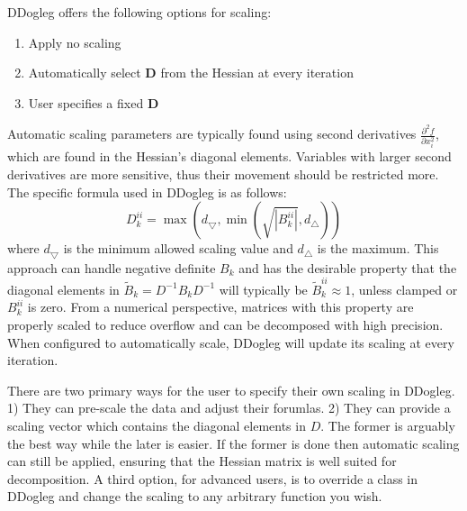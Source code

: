 \documentclass[peerreview,compsoc,onecolumn]{IEEEtran}
\newenvironment{enumargin}[1]{\begin{enumerate}[leftmargin=#1\textwidth , rightmargin=#1\textwidth]}{\end{enumerate}}
\begin{document}
DDogleg offers the following options for scaling:
\begin{enumargin}{0.2}
\item Apply no scaling
\item Automatically select $\bm{D}$ from the Hessian at every iteration
\item User specifies a fixed $\bm{D}$ 
\end{enumargin}
Automatic scaling parameters are typically found using second derivatives $\frac{\partial^2 f}{\partial x^2_i}$, which are found in the Hessian's diagonal elements. Variables with larger second derivatives are more sensitive, thus their movement should be restricted more. The specific formula used in DDogleg is as follows:
\begin{equation}
D_k^{ii} = \max\left( d_{\bigtriangledown},\min\left( \sqrt{|B_k^{ii}|} , d_{\bigtriangleup} \right)\right)
\end{equation}
where $d_{\bigtriangledown}$ is the minimum allowed scaling value and $d_{\bigtriangleup}$ is the maximum. This approach can handle negative definite $B_k$ and has the desirable property \cite{dennis1996} that the diagonal elements in $\tilde{B}_k = D^{-1}B_k D^{-1}$ will typically be $\tilde{B}_k^{ii} \approx 1$, unless clamped or $B_k^{ii}$ is zero. From a numerical perspective, matrices with this property are properly scaled to reduce overflow and can be decomposed with high precision. When configured to automatically scale, DDogleg will update its scaling at every iteration.

There are two primary ways for the user to specify their own scaling in DDogleg. 1) They can pre-scale the data and adjust their forumlas. 2) They can provide a scaling vector which contains the diagonal elements in $D$. The former is arguably the best way while the later is easier. If the former is done then automatic scaling can still be applied, ensuring that the Hessian matrix is well suited for decomposition. A third option, for advanced users, is to override a class in DDogleg and change the scaling to any arbitrary function you wish.
\end{document}

